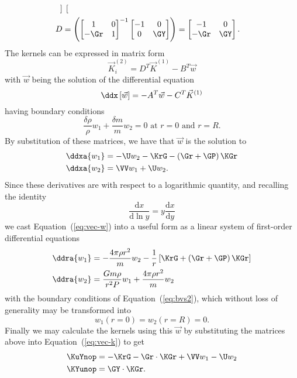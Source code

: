 \begin{description}
\begin{align}
\begin{bmatrix}
  \end{bmatrix} \\
D &= \left(
  \begin{bmatrix}
    1 & 0 \\
    -\Gr & 1
  \end{bmatrix}^{-1}
  \begin{bmatrix}
    -1 & 0 \\
    0 & \GY
  \end{bmatrix} \right)
= \begin{bmatrix}
    -1 & 0 \\
    -\Gr & \GY
  \end{bmatrix}.
\end{align}
The kernels can be expressed in matrix form
\begin{equation} \label{eq:vec-k}
    \vec K^{(2)}_i = D^T \vec K^{(1)} - B^T \vec w
\end{equation}
with $\vec w$ being the solution of the differential equation %
\begin{equation} \label{eq:vec-w}
    \ddx \left[ \vec w \right] = -A^T \vec w - C^T \vec K^{(1)}
\end{equation}
having boundary conditions %
\begin{equation} \label{eq:bvs2}
    \frac{\delta \rho}{\rho} w_1 + \frac{\delta m}{m} w_2 = 0 \text{ at } r=0 \text{ and } r=R.
\end{equation}
By substitution of these matrices, we have that $\vec w$ is the solution to 
\begin{align}
    \ddxa{w_1} &= -\U w_2 - \KrG - \left( \Gr + \GP \right) \KGr \\
    \ddxa{w_2} &= \VV w_1 + \U w_2.
\end{align}
Since these derivatives are with respect to a logarithmic quantity, and recalling the identity
\begin{equation}
    \frac{\text{d}x}{\text{d}\ln y} = y\frac{\text{d}x}{\text{d}y} %
\end{equation}
we cast Equation~(\ref{eq:vec-w}) into a useful form as a linear system of first-order differential equations 
\begin{align}
    \ddra{w_1} &= -\frac{4\pi\rho r^2}{m} w_2 - \frac{1}{r} \left[ \KrG + \left( \Gr + \GP \right) \KGr \right] \\
    \ddra{w_2} &= \frac{G m \rho}{r^2P} w_1 + \frac{4\pi\rho r^2}{m} w_2
\end{align}
with the boundary conditions of Equation~(\ref{eq:bvs2}), which without loss of generality may be transformed into
\begin{equation} \label{eq:bvs}
    w_1(r = 0) = w_2(r=R) = 0.
\end{equation}
Finally we may calculate the kernels using this $\vec w$ by substituting the matrices above into Equation~(\ref{eq:vec-k}) to get
\begin{align}
    \KuYnop &= -\KrG - \Gr \cdot \KGr + \VV w_1 - \U w_2 \\
    \KYunop &= \GY \cdot \KGr.
\end{align}
\end{description}
